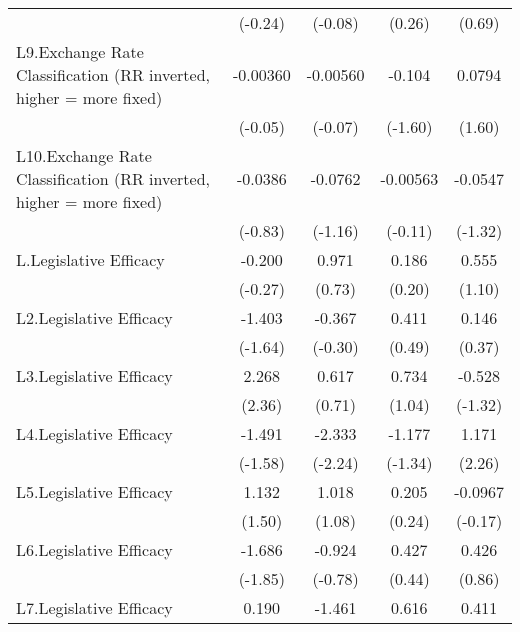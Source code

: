 {\begin{longtable}{l*{4}{c}}
                &  (-0.24)         &  (-0.08)         &   (0.26)         &   (0.69)         \\
[1em]
L9.Exchange Rate Classification (RR inverted, higher = more fixed)& -0.00360         & -0.00560         &   -0.104         &   0.0794         \\
                &  (-0.05)         &  (-0.07)         &  (-1.60)         &   (1.60)         \\
[1em]
L10.Exchange Rate Classification (RR inverted, higher = more fixed)&  -0.0386         &  -0.0762         & -0.00563         &  -0.0547         \\
                &  (-0.83)         &  (-1.16)         &  (-0.11)         &  (-1.32)         \\
[1em]
L.Legislative Efficacy&   -0.200         &    0.971         &    0.186         &    0.555         \\
                &  (-0.27)         &   (0.73)         &   (0.20)         &   (1.10)         \\
[1em]
L2.Legislative Efficacy&   -1.403         &   -0.367         &    0.411         &    0.146         \\
                &  (-1.64)         &  (-0.30)         &   (0.49)         &   (0.37)         \\
[1em]
L3.Legislative Efficacy&    2.268\sym{*}  &    0.617         &    0.734         &   -0.528         \\
                &   (2.36)         &   (0.71)         &   (1.04)         &  (-1.32)         \\
[1em]
L4.Legislative Efficacy&   -1.491         &   -2.333\sym{*}  &   -1.177         &    1.171\sym{*}  \\
                &  (-1.58)         &  (-2.24)         &  (-1.34)         &   (2.26)         \\
[1em]
L5.Legislative Efficacy&    1.132         &    1.018         &    0.205         &  -0.0967         \\
                &   (1.50)         &   (1.08)         &   (0.24)         &  (-0.17)         \\
[1em]
L6.Legislative Efficacy&   -1.686         &   -0.924         &    0.427         &    0.426         \\
                &  (-1.85)         &  (-0.78)         &   (0.44)         &   (0.86)         \\
[1em]
L7.Legislative Efficacy&    0.190         &   -1.461         &    0.616         &    0.411         \\

\end{longtable}}
